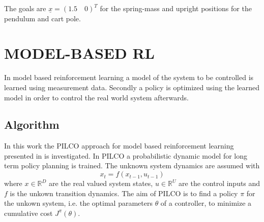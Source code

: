 \documentclass[letterpaper, 10 pt, conference]{ieeeconf}  %
\begin{document}
The goals are $\underline{x}=(1.5\quad 0)^T$ for the spring-mass and upright positions for the pendulum and cart pole.

\section{MODEL-BASED RL}
In model based reinforcement learning a model of the system to be controlled is learned using measurement data. Secondly a policy is optimized using the learned model in order to control the real world system afterwards.

\subsection{Algorithm}
In this work the PILCO %
approach for model based reinforcement learning presented in \cite{PILCO_paper} is investigated.%
\newline In PILCO a probabilistic dynamic model for long term policy planning is trained. The unknown system dynamics are assumed with 
\begin{equation}\label{PILCO_sysEq}
x_t = f\left(x_{t-1},u_{t-1}\right)
\end{equation}
where $x\in \mathbb{R}^D$ are the real valued system states, $u \in \mathbb{R}^U$ are the control inputs and $f$ is the unkown transition dynamics. The aim of PILCO is to find a policy $\pi$ for the unkown system, i.e. the optimal parameters $\theta$ of a controller, to minimize a cumulative cost $J^\pi\left(\theta\right)$. 
\end{document}
